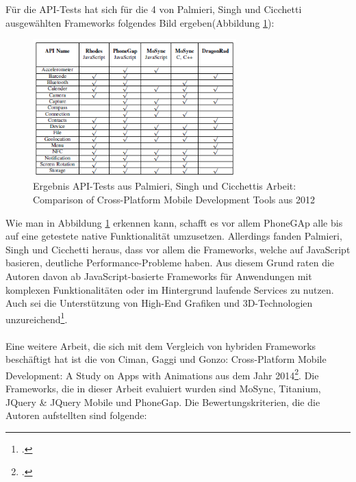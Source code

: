 Für die API-Tests hat sich für die 4 von Palmieri, Singh und Cicchetti ausgewählten Frameworks folgendes Bild ergeben(Abbildung \ref{fig:Ergebnis_API_Test_Publ}): 

\begin{figure}[h]
	\centering
	\includegraphics[width=0.7\textwidth]{Bilder/Ergebnis_Sensornutzung_Comparison_of_Cross-Platform_Mob_Dev.PNG}
	\caption{Ergebnis API-Tests aus Palmieri, Singh und Cicchettis Arbeit: Comparison of Cross-Platform Mobile Development Tools aus 2012}
	\label{fig:Ergebnis_API_Test_Publ}
\end{figure}

Wie man in Abbildung \ref{fig:Ergebnis_API_Test_Publ} erkennen kann, schafft es vor allem PhoneGAp alle bis auf eine getestete native Funktionalität umzusetzen. Allerdings fanden Palmieri, Singh und Cicchetti heraus, dass vor allem die Frameworks, welche auf JavaScript basieren, deutliche Performance-Probleme haben. Aus diesem Grund raten die Autoren davon ab JavaScript-basierte Frameworks für Anwendungen mit komplexen Funktionalitäten oder im Hintergrund laufende Services zu nutzen. Auch sei die Unterstützung von High-End Grafiken und 3D-Technologien unzureichend\footcite{ComparisonCrossPlatMobDevTools}. 
\\
\\
Eine weitere Arbeit, die sich mit dem Vergleich von hybriden Frameworks beschäftigt hat ist die von Ciman, Gaggi und Gonzo: Cross-Platform Mobile Development: A Study on Apps with Animations aus dem Jahr 2014\footcite{CrossPlatMobDevStudyAnim}. Die Frameworks, die in dieser Arbeit evaluiert wurden sind MoSync, Titanium, JQuery \& JQuery Mobile und PhoneGap. Die Bewertungskriterien, die die Autoren aufstellten sind folgende:

